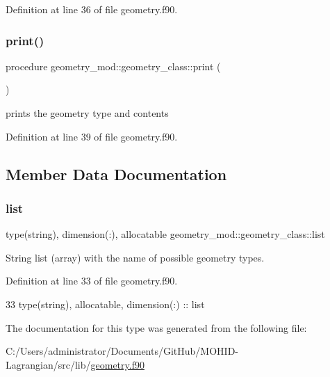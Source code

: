 Definition at line 36 of file geometry.\+f90.

\mbox{\label{structgeometry__mod_1_1geometry__class_afbb83bea5cd3f73708b448d3c732ea7c}} 
\subsubsection{\texorpdfstring{print()}{print()}}
{\footnotesize\ttfamily procedure geometry\+\_\+mod\+::geometry\+\_\+class\+::print (\begin{DoxyParamCaption}{ }\end{DoxyParamCaption})\hspace{0.3cm}{\ttfamily [private]}}



prints the geometry type and contents 



Definition at line 39 of file geometry.\+f90.



\subsection{Member Data Documentation}
\mbox{\label{structgeometry__mod_1_1geometry__class_a218ff308d9bb94f4386573d7329babc6}} 
\subsubsection{\texorpdfstring{list}{list}}
{\footnotesize\ttfamily type(string), dimension(\+:), allocatable geometry\+\_\+mod\+::geometry\+\_\+class\+::list\hspace{0.3cm}{\ttfamily [private]}}



String list (array) with the name of possible geometry types. 



Definition at line 33 of file geometry.\+f90.


\begin{DoxyCode}
33         \textcolor{keywordtype}{type}(string), \textcolor{keywordtype}{allocatable}, \textcolor{keywordtype}{dimension(:)} :: list
\end{DoxyCode}


The documentation for this type was generated from the following file\+:\begin{DoxyCompactItemize}
\item 
C\+:/\+Users/administrator/\+Documents/\+Git\+Hub/\+M\+O\+H\+I\+D-\/\+Lagrangian/src/lib/\mbox{\hyperlink{geometry_8f90}{geometry.\+f90}}\end{DoxyCompactItemize}
